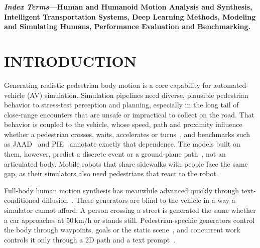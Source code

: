 \documentclass[letterpaper, 10 pt, conference]{ieeeconf}
\begin{document}
{\small\bfseries\noindent\textit{Index Terms}---Human and Humanoid Motion Analysis and Synthesis, Intelligent Transportation Systems, Deep Learning Methods, Modeling and Simulating Humans, Performance Evaluation and Benchmarking.\par}


\section{INTRODUCTION}

Generating realistic pedestrian body motion is a core capability for automated-vehicle (AV) simulation.
Simulation pipelines need diverse, plausible pedestrian behavior to stress-test perception and planning, especially in the long tail of close-range encounters that are unsafe or impractical to collect on the road.
That behavior is coupled to the vehicle, whose speed, path and proximity influence whether a pedestrian crosses, waits, accelerates or turns~\cite{camara2021pedmodels2}, and benchmarks such as JAAD~\cite{rasouli2017jaad} and PIE~\cite{rasouli2019pie} annotate exactly that dependence.
The models built on them, however, predict a discrete event or a ground-plane path~\cite{alahi2016sociallstm,salzmann2020trajectron,gu2022mid}, not an articulated body.
Mobile robots that share sidewalks with people face the same gap, as their simulators also need pedestrians that react to the robot.

Full-body human motion synthesis has meanwhile advanced quickly through text-conditioned diffusion~\cite{chen2023mld,tevet2023mdm,zhang2022motiondiffuse,guo2024momask}.
These generators are blind to the vehicle in a way a simulator cannot afford. A person crossing a street is generated the same whether a car approaches at 50\,km/h or stands still.
Pedestrian-specific generators control the body through waypoints, goals or the static scene~\cite{rempe2023tracepace,liu2025pedgen}, and concurrent work controls it only through a 2D path and a text prompt~\cite{liu2026controlped}.
\end{document}
